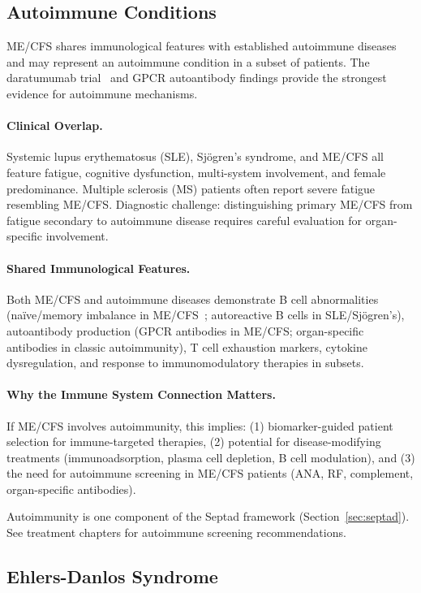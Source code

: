 \subsection{Autoimmune Conditions}

ME/CFS shares immunological features with established autoimmune diseases and may represent an autoimmune condition in a subset of patients. The daratumumab trial~\cite{Fluge2025daratumumab} and GPCR autoantibody findings provide the strongest evidence for autoimmune mechanisms.

\paragraph{Clinical Overlap.}
Systemic lupus erythematosus (SLE), Sjögren's syndrome, and ME/CFS all feature fatigue, cognitive dysfunction, multi-system involvement, and female predominance. Multiple sclerosis (MS) patients often report severe fatigue resembling ME/CFS. Diagnostic challenge: distinguishing primary ME/CFS from fatigue secondary to autoimmune disease requires careful evaluation for organ-specific involvement.

\paragraph{Shared Immunological Features.}
Both ME/CFS and autoimmune diseases demonstrate B cell abnormalities (naïve/memory imbalance in ME/CFS~\cite{walitt2024deep}; autoreactive B cells in SLE/Sjögren's), autoantibody production (GPCR antibodies in ME/CFS; organ-specific antibodies in classic autoimmunity), T cell exhaustion markers, cytokine dysregulation, and response to immunomodulatory therapies in subsets.

\paragraph{Why the Immune System Connection Matters.}
If ME/CFS involves autoimmunity, this implies: (1) biomarker-guided patient selection for immune-targeted therapies, (2) potential for disease-modifying treatments (immunoadsorption, plasma cell depletion, B cell modulation), and (3) the need for autoimmune screening in ME/CFS patients (ANA, RF, complement, organ-specific antibodies).

Autoimmunity is one component of the Septad framework (Section~\ref{sec:septad}). See treatment chapters for autoimmune screening recommendations.

\subsection{Ehlers-Danlos Syndrome}

